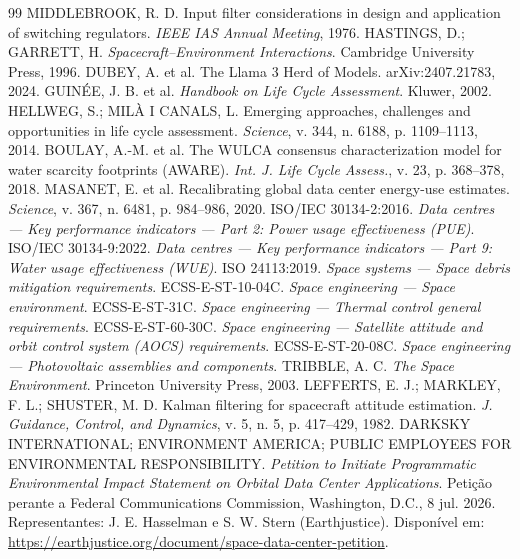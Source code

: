 \documentclass[11pt,a4paper]{article}
\begin{document}
\begin{thebibliography}{99}
 MIDDLEBROOK, R. D. Input filter considerations in design and application of switching regulators. \emph{IEEE IAS Annual Meeting}, 1976.
 HASTINGS, D.; GARRETT, H. \emph{Spacecraft--Environment Interactions}. Cambridge University Press, 1996.
 DUBEY, A. et al. The Llama 3 Herd of Models. arXiv:2407.21783, 2024.
 GUINÉE, J. B. et al. \emph{Handbook on Life Cycle Assessment}. Kluwer, 2002.
 HELLWEG, S.; MILÀ I CANALS, L. Emerging approaches, challenges and opportunities in life cycle assessment. \emph{Science}, v. 344, n. 6188, p. 1109--1113, 2014.
 BOULAY, A.-M. et al. The WULCA consensus characterization model for water scarcity footprints (AWARE). \emph{Int. J. Life Cycle Assess.}, v. 23, p. 368--378, 2018.
 MASANET, E. et al. Recalibrating global data center energy-use estimates. \emph{Science}, v. 367, n. 6481, p. 984--986, 2020.
 ISO/IEC 30134-2:2016. \emph{Data centres --- Key performance indicators --- Part 2: Power usage effectiveness (PUE)}.
 ISO/IEC 30134-9:2022. \emph{Data centres --- Key performance indicators --- Part 9: Water usage effectiveness (WUE)}.
 ISO 24113:2019. \emph{Space systems --- Space debris mitigation requirements}.
 ECSS-E-ST-10-04C. \emph{Space engineering --- Space environment}.
 ECSS-E-ST-31C. \emph{Space engineering --- Thermal control general requirements}.
 ECSS-E-ST-60-30C. \emph{Space engineering --- Satellite attitude and orbit control system (AOCS) requirements}.
 ECSS-E-ST-20-08C. \emph{Space engineering --- Photovoltaic assemblies and components}.
 TRIBBLE, A. C. \emph{The Space Environment}. Princeton University Press, 2003.
 LEFFERTS, E. J.; MARKLEY, F. L.; SHUSTER, M. D. Kalman filtering for spacecraft attitude estimation. \emph{J. Guidance, Control, and Dynamics}, v. 5, n. 5, p. 417--429, 1982.
 DARKSKY INTERNATIONAL; ENVIRONMENT AMERICA; PUBLIC EMPLOYEES FOR ENVIRONMENTAL RESPONSIBILITY. \emph{Petition to Initiate Programmatic Environmental Impact Statement on Orbital Data Center Applications}. Petição perante a Federal Communications Commission, Washington, D.C., 8 jul. 2026. Representantes: J. E. Hasselman e S. W. Stern (Earthjustice). Disponível em: \url{https://earthjustice.org/document/space-data-center-petition}.

\end{thebibliography}
\end{document}
